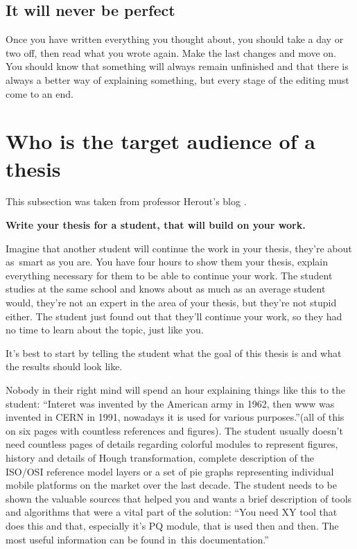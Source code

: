 \subsection*{It will never be perfect}
Once you have written everything you thought about, you should take a day or two off, then read what you wrote again. Make the last changes and move on. You should know that something will always remain unfinished and that there is always a better way of explaining something, but every stage of the editing must come to an end.

\section{Who is the target audience of a thesis}

This subsection was taken from professor Herout's blog \cite{Herout}.

\bigskip
\noindent \bf Write your thesis for a student, that will build on your work. \rm
\bigskip

Imagine that another student will continue the work in your thesis, they're about as~smart as you are. You have four hours to show them your thesis, explain everything necessary for them to be able to continue your work. The student studies at the same school and knows about as much as an average student would, they're not an expert in the area of your thesis, but they're not stupid either. The student just found out that they'll continue your work, so they had no time to learn about the topic, just like you.

It's best to start by telling the student what the goal of this thesis is and what the results should look like.

Nobody in their right mind will spend an hour explaining things like this to the student: ``{\mbox{Interet} was invented by the American army in 1962, then www was invented in CERN in 1991, nowadays it is used for various purposes.''}(all of this on six pages with countless references and figures).
The student usually doesn't need countless pages of details regarding colorful modules to represent figures, history and details of Hough transformation, complete description of the ISO/OSI reference model layers or a set of pie graphs representing individual mobile platforms on the market over the last decade.
The student needs to be shown the valuable sources that helped you and wants a brief description of tools and algorithms that were a vital part of the solution: ``{You need XY tool that does this and that, especially it's PQ module, that is used then and then. The most useful information can be found in~this documentation.}''

